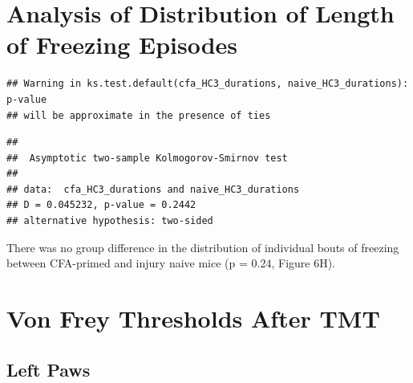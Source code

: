 \documentclass[
]{book}
\newenvironment{Shaded}{\begin{snugshade}}{\end{snugshade}}
\newcommand{\FunctionTok}[1]{\textcolor[rgb]{0.13,0.29,0.53}{\textbf{#1}}}
\newcommand{\NormalTok}[1]{#1}
\newcommand{\OtherTok}[1]{\textcolor[rgb]{0.56,0.35,0.01}{#1}}
\newcommand{\SpecialCharTok}[1]{\textcolor[rgb]{0.81,0.36,0.00}{\textbf{#1}}}
\newcommand{\StringTok}[1]{\textcolor[rgb]{0.31,0.60,0.02}{#1}}
\begin{document}
\section*{Analysis of Distribution of Length of Freezing Episodes}\label{analysis-of-distribution-of-length-of-freezing-episodes}

\begin{Shaded}
\end{Shaded}

\begin{verbatim}
## Warning in ks.test.default(cfa_HC3_durations, naive_HC3_durations): p-value
## will be approximate in the presence of ties
\end{verbatim}

\begin{verbatim}
## 
##  Asymptotic two-sample Kolmogorov-Smirnov test
## 
## data:  cfa_HC3_durations and naive_HC3_durations
## D = 0.045232, p-value = 0.2442
## alternative hypothesis: two-sided
\end{verbatim}

There was no group difference in the distribution of individual bouts of freezing between CFA-primed and injury naive mice (p = 0.24, Figure 6H).

\section*{Von Frey Thresholds After TMT}\label{von-frey-thresholds-after-tmt}

\subsection*{Left Paws}\label{left-paws}
\end{document}
